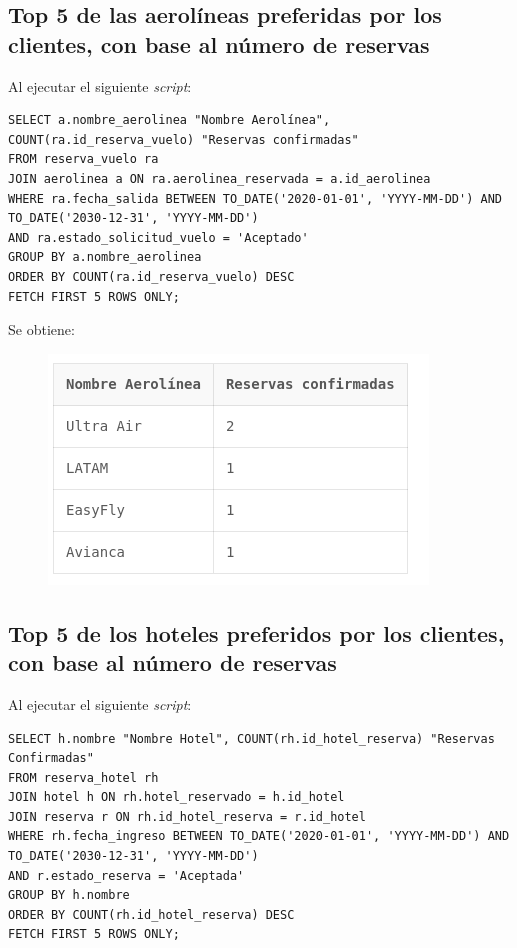 \documentclass{article}
\begin{document}
\newpage


\subsection{Top 5 de las aerolíneas preferidas por los clientes, con base al número de reservas}

Al ejecutar el siguiente \textit{script}:
\begin{lstlisting}
SELECT a.nombre_aerolinea "Nombre Aerolínea", COUNT(ra.id_reserva_vuelo) "Reservas confirmadas"
FROM reserva_vuelo ra
JOIN aerolinea a ON ra.aerolinea_reservada = a.id_aerolinea
WHERE ra.fecha_salida BETWEEN TO_DATE('2020-01-01', 'YYYY-MM-DD') AND TO_DATE('2030-12-31', 'YYYY-MM-DD')
AND ra.estado_solicitud_vuelo = 'Aceptado'
GROUP BY a.nombre_aerolinea
ORDER BY COUNT(ra.id_reserva_vuelo) DESC
FETCH FIRST 5 ROWS ONLY;
\end{lstlisting}

Se obtiene:

\begin{figure}[h]
    \centering
    \includegraphics[width=0.75\linewidth]{img/Consulta_6.png}
\end{figure}

\newpage

\subsection{Top 5 de los hoteles preferidos por los clientes, con base al número de reservas}
Al ejecutar el siguiente \textit{script}:

\begin{lstlisting}
SELECT h.nombre "Nombre Hotel", COUNT(rh.id_hotel_reserva) "Reservas Confirmadas"
FROM reserva_hotel rh
JOIN hotel h ON rh.hotel_reservado = h.id_hotel
JOIN reserva r ON rh.id_hotel_reserva = r.id_hotel
WHERE rh.fecha_ingreso BETWEEN TO_DATE('2020-01-01', 'YYYY-MM-DD') AND TO_DATE('2030-12-31', 'YYYY-MM-DD')
AND r.estado_reserva = 'Aceptada'
GROUP BY h.nombre
ORDER BY COUNT(rh.id_hotel_reserva) DESC
FETCH FIRST 5 ROWS ONLY;
\end{lstlisting}
\end{document}
